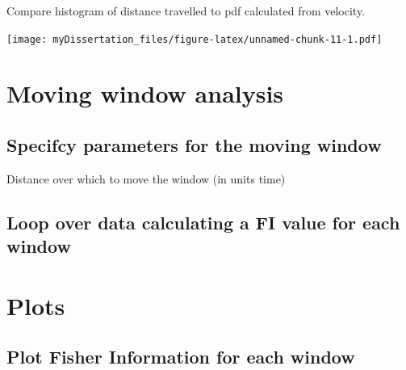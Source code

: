 \documentclass[12pt,twoside]{reedthesis}
\newenvironment{Shaded}{\begin{snugshade}}{\end{snugshade}}
\newcommand{\KeywordTok}[1]{\textcolor[rgb]{0.13,0.29,0.53}{\textbf{#1}}}
\newcommand{\DataTypeTok}[1]{\textcolor[rgb]{0.13,0.29,0.53}{#1}}
\newcommand{\DecValTok}[1]{\textcolor[rgb]{0.00,0.00,0.81}{#1}}
\newcommand{\StringTok}[1]{\textcolor[rgb]{0.31,0.60,0.02}{#1}}
\newcommand{\CommentTok}[1]{\textcolor[rgb]{0.56,0.35,0.01}{\textit{#1}}}
\newcommand{\OperatorTok}[1]{\textcolor[rgb]{0.81,0.36,0.00}{\textbf{#1}}}
\newcommand{\NormalTok}[1]{#1}
\begin{document}
Compare histogram of distance travelled to pdf calculated from velocity.

\texttt{[image: myDissertation\_files/figure-latex/unnamed-chunk-11-1.pdf]}

\section{Moving window analysis}\label{moving-window-analysis}

\subsection{Specifcy parameters for the moving
window}\label{specifcy-parameters-for-the-moving-window}

Distance over which to move the window (in units time)
\begin{Shaded}
\end{Shaded}
\subsection{Loop over data calculating a FI value for each
window}\label{loop-over-data-calculating-a-fi-value-for-each-window}

\section{Plots}\label{plots}

\subsection{Plot Fisher Information for each
window}\label{plot-fisher-information-for-each-window}
\end{document}
